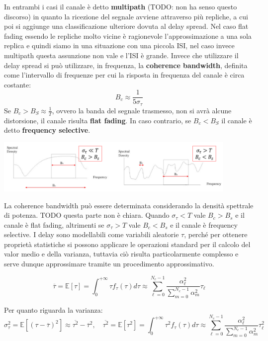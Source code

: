 In entrambi i casi il canale è detto \textbf{multipath} (TODO: non ha senso questo discorso) in quanto la ricezione del segnale avviene attraverso più repliche, a cui poi si aggiunge una classificazione ulteriore dovuta al delay spread.
Nel caso flat fading essendo le repliche molto vicine è ragionevole l'approssimazione a una sola replica e quindi siamo in una situazione con una piccola ISI, nel caso invece multipath questa assunzione non vale e l'ISI è grande.
Invece che utilizzare il delay spread si può utilizzare, in frequenza, la \textbf{coherence bandwidth}, definita come l'intervallo di frequenze per cui la risposta in frequenza del canale è circa costante:
\[
    B_c \approx \frac{1}{5\sigma_\tau}
\]
Se $B_c > B_S \approx \frac{1}{T}$, ovvero la banda del segnale trasmesso, non si avrà alcune distorsione, il canale risulta \textbf{flat fading}. In caso contrario, se $B_c < B_S$ il canale è detto \textbf{frequency selective}.
\begin{center}
    \includegraphics[width=0.875\textwidth]{imgs/coherence_bandwidth.png}
\end{center}
La coherence bandwidth può essere determinata considerando la densità spettrale di potenza.
TODO questa parte non è chiara.
Quando $\sigma_{\tau} < T$ vale $B_c > B_s$ e il canale è flat fading, altrimenti se $\sigma_{\tau} > T$ vale $B_c < B_s$ e il canale è frequency selective.
I delay sono modellabili come variabili aleatorie $\tau$, perché per ottenere proprietà statistiche si possono applicare le operazioni standard per il calcolo del valor medio e della varianza, tuttavia ciò risulta particolarmente complesso e serve dunque approssimare tramite un procedimento approssimativo.


\[
    \overline{\tau} = \mathbb{E} \left[\tau\right] = \int_{0}^{+\infty} \tau f_{\tau}(\tau) d\tau \approx \sum_{\ell=0}^{N_c-1} \frac{\alpha_{\ell}^2}{\sum_{m=0}^{N_c-1} \alpha_{m}^2} \tau_{\ell}
\]

Per quanto riguarda la varianza:
\[
    \sigma_\tau^2 = \mathbb{E}\left[({\tau - \overline{\tau}})^2\right] \approx \overline{\tau^2} - \overline{\tau}^2, \quad \overline{\tau^2} = \mathbb{E} \left[\tau^2\right] = \int_{0}^{+\infty} \tau^2 f_{\tau}(\tau) d\tau \approx \sum_{\ell=0}^{N_c-1} \frac{\alpha_{\ell}^2}{\sum_{m=0}^{N_c-1} \alpha_{m}^2} \tau_{\ell}^2
\]

